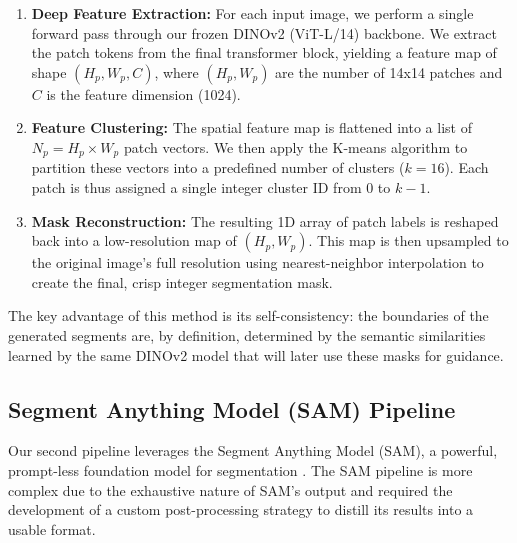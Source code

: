 \begin{enumerate}
    \item \textbf{Deep Feature Extraction:} For each input image, we perform a single forward pass through our frozen DINOv2 (ViT-L/14) backbone. We extract the patch tokens from the final transformer block, yielding a feature map of shape $(H_p, W_p, C)$, where $(H_p, W_p)$ are the number of 14x14 patches and $C$ is the feature dimension (1024).
    \item \textbf{Feature Clustering:} The spatial feature map is flattened into a list of $N_p = H_p \times W_p$ patch vectors. We then apply the K-means algorithm to partition these vectors into a predefined number of clusters ($k=16$). Each patch is thus assigned a single integer cluster ID from 0 to $k-1$.
    \item \textbf{Mask Reconstruction:} The resulting 1D array of patch labels is reshaped back into a low-resolution map of $(H_p, W_p)$. This map is then upsampled to the original image's full resolution using nearest-neighbor interpolation to create the final, crisp integer segmentation mask.
\end{enumerate}
The key advantage of this method is its self-consistency: the boundaries of the generated segments are, by definition, determined by the semantic similarities learned by the same DINOv2 model that will later use these masks for guidance.

\subsection{Segment Anything Model (SAM) Pipeline}
Our second pipeline leverages the Segment Anything Model (SAM), a powerful, prompt-less foundation model for segmentation \cite{kirillov2023segment}. The SAM pipeline is more complex due to the exhaustive nature of SAM's output and required the development of a custom post-processing strategy to distill its results into a usable format.

